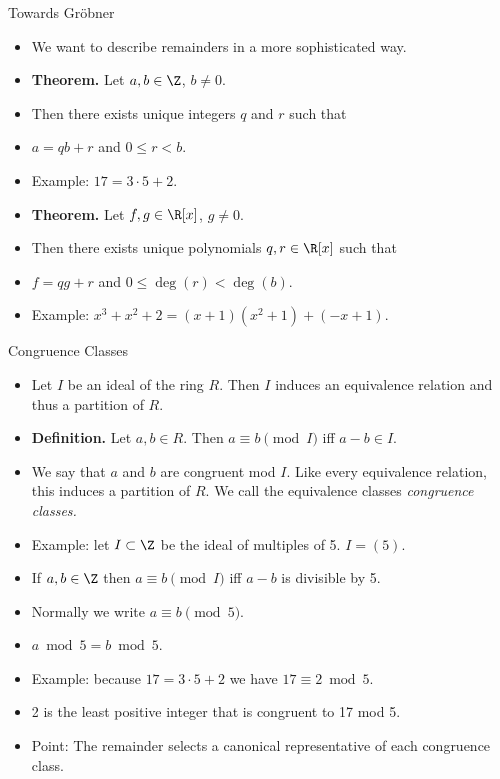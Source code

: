 \documentclass{beamer}
\begin{document}

\begin{frame}{Towards Gr\"{o}bner}

\begin{itemize}
  \item We want to describe remainders in a more sophisticated way.
  \item \textbf{Theorem.} Let $a,b\in\Z$, $b\not=0$.
  \item Then there exists unique integers $q$ and $r$ such that
  \item $a = qb +r$ and $0\leq r < b$.
  \item Example: $17 = 3 \cdot 5 + 2$.
  \item \textbf{Theorem.} Let $f,g\in\R[x]$, $g\not=0$.
  \item Then there exists unique polynomials $q,r\in\R[x]$ such that
  \item $f = qg +r$ and $0\leq \deg(r) < \deg(b)$.
  \item Example: $x^3 + x^2 + 2 = (x+1)(x^2+1) + ( -x + 1)$.
\end{itemize}
\end{frame}

\begin{frame}{Congruence Classes}

\begin{itemize}
  \item Let $I$ be an ideal of the ring $R$. Then $I$ induces an equivalence relation and thus a partition of $R$.
  \item \textbf{Definition.} Let $a,b\in R$. Then $a \equiv b \pmod I$ iff $a - b \in I$.
  \item We say that $a$ and $b$ are congruent mod $I$. Like every equivalence relation, this induces a partition of
  $R$. We call the equivalence classes \emph{congruence classes.}
  \item Example: let $I\subset \Z$ be the ideal of multiples of 5. $I=(5)$.
  \item If $a,b\in \Z$ then $a\equiv b \pmod I$ iff $a-b$ is divisible by 5.
  \item Normally we write $a\equiv b \pmod 5$.
  \item $a\bmod 5 = b \bmod 5$.
  \item Example: because $17 = 3 \cdot 5 + 2$ we have $17 \equiv 2 \bmod 5$.
  \item 2 is the least positive integer that is congruent to 17 mod 5.
  \item Point: The remainder selects a canonical representative of each congruence class.
\end{itemize}
\end{frame}
\end{document}
